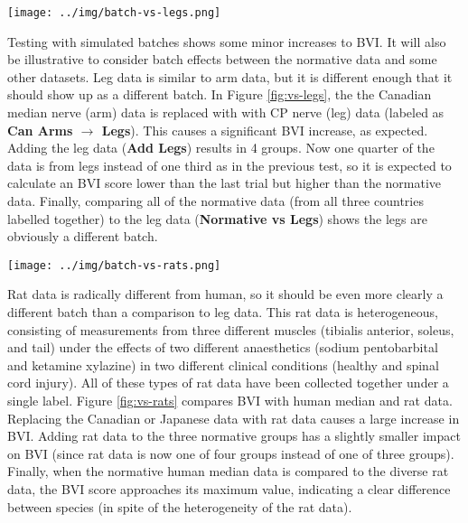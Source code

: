 \documentclass[12pt]{article}
\begin{document}

\pagebreak

\begin{figure*}
  \centering
       \texttt{[image: ../img/batch-vs-legs.png]}
         \caption{}
  \label{fig:vs-legs}
\end{figure*}

Testing with simulated batches shows some minor increases to BVI. It will also be illustrative to consider batch effects between the normative data and some other datasets. Leg data is similar to arm data, but it is different enough that it should show up as a different batch. In Figure \ref{fig:vs-legs}, the the Canadian median nerve (arm) data is replaced with with CP nerve (leg) data (labeled as \textbf{Can Arms $\rightarrow$ Legs}). This causes a significant BVI increase, as expected. Adding the leg data (\textbf{Add Legs}) results in 4 groups. Now one quarter of the data is from legs instead of one third as in the previous test, so it is expected to calculate an BVI score lower than the last trial but higher than the normative data. Finally, comparing all of the normative data (from all three countries labelled together) to the leg data (\textbf{Normative vs Legs}) shows the legs are obviously a different batch.

\pagebreak

\begin{figure*}
  \centering
       \texttt{[image: ../img/batch-vs-rats.png]}
         \caption{}
  \label{fig:vs-rats}
\end{figure*}

Rat data is radically different from human, so it should be even more clearly a different batch than a comparison to leg data. This rat data is heterogeneous, consisting of measurements from three different muscles (tibialis anterior, soleus, and tail) under the effects of two different anaesthetics (sodium pentobarbital and ketamine xylazine) in two different clinical conditions (healthy and spinal cord injury). All of these types of rat data have been collected together under a single label. Figure \ref{fig:vs-rats} compares BVI with human median and rat data. Replacing the Canadian or Japanese data with rat data causes a large increase in BVI. Adding rat data to the three normative groups has a slightly smaller impact on BVI (since rat data is now one of four groups instead of one of three groups). Finally, when the normative human median data is compared to the diverse rat data, the BVI score approaches its maximum value, indicating a clear difference between species (in spite of the heterogeneity of the rat data).
\end{document}
